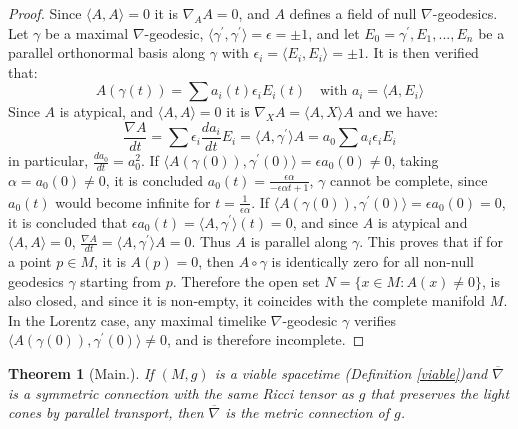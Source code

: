 \documentclass{amsart}%
\newtheorem{theorem}{Theorem}
\theoremstyle{plain}
\numberwithin{equation}{section}
\begin{document}
\begin{proof}
Since $\langle A,A\rangle=0$ it is $\nabla_{A}A=0$, and $A$ defines a field of
null $\nabla$-geodesics. Let $\gamma$ be a maximal $\nabla$-geodesic,
$\langle\gamma^{\prime},\gamma^{\prime}\rangle=\epsilon=\pm1$, and let
$E_{0}=\gamma^{\prime},E_{1},...,E_{n}$ be a parallel orthonormal basis along
$\gamma$ with $\epsilon_{i}=\langle E_{i},E_{i}\rangle=\pm1$. It is then
verified that:
\[
A(\gamma(t))=\sum a_{i}(t)\epsilon_{i}E_{i}(t)\quad\text{with }a_{i}=\langle
A,E_{i}\rangle
\]
Since $A$ is atypical, and $\langle A,A\rangle=0$ it is $\nabla_{X}A=\langle
A,X\rangle A$ and we have:
\[
\frac{\nabla A}{dt}=\sum\epsilon_{i}\frac{da_{i}}{dt}E_{i}=\langle
A,\gamma^{\prime}\rangle A=a_{0}\sum a_{i}\epsilon_{i}E_{i}%
\]
in particular, $\frac{da_{0}}{dt}=a_{0}^{2}$. If $\langle A(\gamma
(0)),\gamma^{\prime}(0)\rangle=\epsilon a_{0}(0)\neq0$, taking $\alpha
=a_{0}(0)\neq0$, it is concluded $a_{0}(t)=\frac{\epsilon\alpha}%
{-\epsilon\alpha t+1}$, $\gamma$ cannot be complete, since $a_{0}(t)$ would
become infinite for $t=\frac{1}{\epsilon\alpha}$. If $\langle A(\gamma
(0)),\gamma^{\prime}(0)\rangle=\epsilon a_{0}(0)=0$, it is concluded that
$\epsilon a_{0}(t)=\langle A,\gamma^{\prime}\rangle(t)=0$, and since $A$ is
atypical and $\langle A,A\rangle=0$, $\frac{\nabla A}{dt}=\langle
A,\gamma^{\prime}\rangle A=0$. Thus $A$ is parallel along $\gamma$. This
proves that if for a point $p\in M$, it is $A(p)=0$, then $A\circ\gamma$ is
identically zero for all non-null geodesics $\gamma$ starting from $p$.
Therefore the open set $N=\{x\in M:A(x)\neq0\}$, is also closed, and since it
is non-empty, it coincides with the complete manifold $M$. In the Lorentz
case, any maximal timelike $\nabla$-geodesic $\gamma$ verifies $\langle
A(\gamma(0)),\gamma^{\prime}(0)\rangle\neq0$, and is therefore incomplete.
\end{proof}

\begin{theorem}
[Main.]\label{1.8}If $\left(  M,g\right)  $ is a viable spacetime (Definition
\ref{viable})and $\overline{\nabla}$ is a symmetric connection with the same
Ricci tensor as $g$ that preserves the light cones by parallel transport, then
$\overline{\nabla}$ is the metric connection of $g$.
\end{theorem}
\end{document}
